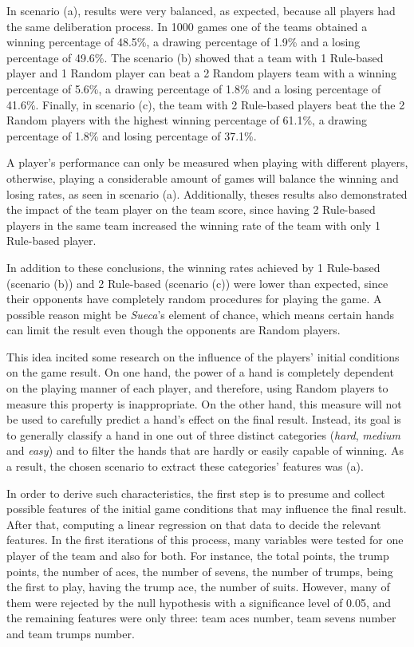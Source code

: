 In scenario (a), results were very balanced, as expected, because all players had the same deliberation process.
In 1000 games one of the teams obtained a winning percentage of 48.5\%, a drawing percentage of 1.9\% and a losing percentage of 49.6\%.
The scenario (b) showed that a team with 1 Rule-based player and 1 Random player can beat a 2 Random players team with a winning percentage of 5.6\%, a drawing percentage of 1.8\% and a losing percentage of 41.6\%.
Finally, in scenario (c), the team with 2 Rule-based players beat the the 2 Random players with the highest winning percentage of 61.1\%, a drawing percentage of 1.8\% and losing percentage of 37.1\%.

A player's performance can only be measured when playing with different players, otherwise, playing a considerable amount of games will balance the winning and losing rates, as seen in scenario (a).
Additionally, theses results also demonstrated the impact of the team player on the team score, since having 2 Rule-based players in the same team increased the winning rate of the team with only 1 Rule-based player.

In addition to these conclusions, the winning rates achieved by 1 Rule-based (scenario (b)) and 2 Rule-based (scenario (c)) were lower than expected, since their opponents have completely random procedures for playing the game.
A possible reason might be \emph{Sueca}'s element of chance, which means certain hands can limit the result even though the opponents are Random players.

This idea incited some research on the influence of the players' initial conditions on the game result.
On one hand, the power of a hand is completely dependent on the playing manner of each player, and therefore, using Random players to measure this property is inappropriate.
On the other hand, this measure will not be used to carefully predict a hand's effect on the final result.
Instead, its goal is to generally classify a hand in one out of three distinct categories (\emph{hard}, \emph{medium} and \emph{easy}) and to filter the hands that are hardly or easily capable of winning.
As a result, the chosen scenario to extract these categories' features was (a).

In order to derive such characteristics, the first step is to presume and collect possible features of the initial game conditions that may influence the final result.
After that, computing a linear regression on that data to decide the relevant features.
In the first iterations of this process, many variables were tested for one player of the team and also for both.
For instance, the total points, the trump points, the number of aces, the number of sevens, the number of trumps, being the first to play, having the trump ace, the number of suits.
However, many of them were rejected by the null hypothesis with a significance level of 0.05, and the remaining features were only three: team aces number, team sevens number and team trumps number.

